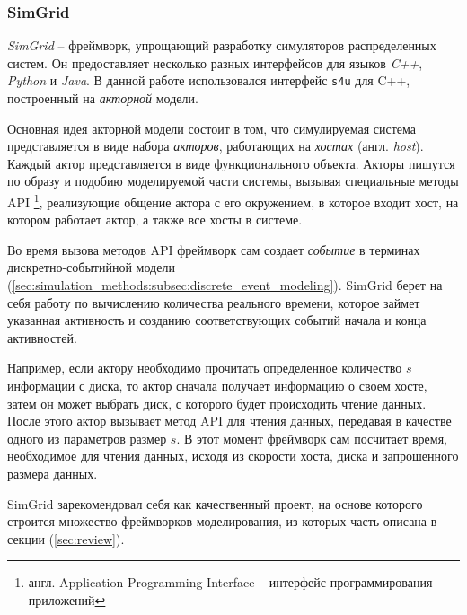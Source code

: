 \documentclass[../diploma.tex]{subfile}
\begin{document}
    \subsubsection{SimGrid}
    \label{sec:simulation_techonogies:subsec:simgrid}
    \textit{SimGrid}\cite{simgrid}\cite{simgrid_paper} -- фреймворк, упрощающий
    разработку симуляторов распределенных систем. Он предоставляет несколько
    разных интерфейсов для языков \textit{C++}, \textit{Python} и \textit{Java}.
    В данной работе использовался интерфейс \texttt{s4u} для C++, построенный на
    \textit{акторной} модели. 

    
    Основная идея акторной модели состоит в том, что симулируемая система
    представляется в виде набора \textit{акторов}, работающих на \textit{хостах}
    (англ. \textit{host}). Каждый актор представляется в виде функционального
    объекта. Акторы пишутся по образу и подобию моделируемой части системы,
    вызывая специальные методы API \footnote{англ. Application Programming
    Interface -- интерфейс программирования приложений}, реализующие общение
    актора с его окружением, в которое входит хост, на котором работает актор, а
    также все хосты в системе.
    
    Во время вызова методов API фреймворк сам создает \textit{событие} в
    терминах дискретно-событийной модели
    (\ref{sec:simulation_methods:subsec:discrete_event_modeling}). SimGrid берет
    на себя работу по вычислению количества реального времени, которое займет
    указанная активность и созданию соответствующих событий начала и конца
    активностей. 
    
    Например, если актору необходимо прочитать определенное количество $s$
    информации с диска, то актор сначала получает информацию о своем хосте,
    затем он может выбрать диск, с которого будет происходить чтение данных.
    После этого актор вызывает метод API для чтения данных, передавая в качестве
    одного из параметров размер $s$. В этот момент фреймворк сам посчитает
    время, необходимое для чтения данных, исходя из скорости хоста, диска и
    запрошенного размера данных. 

    SimGrid зарекомендовал себя как качественный проект, на основе которого
    строится множество фреймворков моделирования, из которых часть описана в
    секции (\ref{sec:review}).
\end{document}
